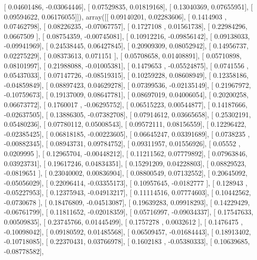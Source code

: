 \documentclass{article}
\begin{document}
       [ 0.04601486, -0.03064446],
       [ 0.07529835,  0.01819168],
       [ 0.13040369,  0.07655951],
       [ 0.09594622,  0.06176055]]), array([[ 0.09140201,  0.02283606],
       [ 0.1414903 ,  0.07462798],
       [ 0.08226235, -0.07067757],
       [ 0.1727108 ,  0.01561738],
       [ 0.22984296,  0.0667509 ],
       [ 0.08754359, -0.00745081],
       [ 0.10912216, -0.09856142],
       [ 0.09138033, -0.09941969],
       [ 0.24538445,  0.06427845],
       [ 0.20909309,  0.08052942],
       [ 0.14956737,  0.02275229],
       [ 0.08373613,  0.071151  ],
       [ 0.05708658,  0.01408891],
       [ 0.05710898,  0.08101997],
       [ 0.21988088, -0.01005381],
       [ 0.1479653 , -0.05524875],
       [ 0.0741556 ,  0.05437033],
       [ 0.07147726, -0.08519315],
       [ 0.10259228,  0.08608949],
       [ 0.12358186, -0.04859849],
       [ 0.08897423,  0.04629278],
       [ 0.07399536, -0.02135149],
       [ 0.21967972, -0.10759673],
       [ 0.19137009,  0.08647781],
       [ 0.08697019,  0.04006054],
       [ 0.20200258,  0.06673772],
       [ 0.1760017 , -0.06295752],
       [ 0.06515223,  0.00544877],
       [ 0.14187666, -0.02637505],
       [ 0.13886305, -0.07382708],
       [ 0.07914612,  0.03665658],
       [ 0.25302191,  0.05480236],
       [ 0.07780112,  0.05008543],
       [ 0.09572111,  0.08156559],
       [ 0.12296422, -0.02385425],
       [ 0.06818185, -0.00223605],
       [ 0.06645247,  0.03391689],
       [ 0.0738235 , -0.00882345],
       [ 0.08943731,  0.09784752],
       [ 0.09311957,  0.01556926],
       [ 0.05552   ,  0.0209995 ],
       [ 0.12965704, -0.00448212],
       [ 0.11211562,  0.07779892],
       [ 0.07963846,  0.03923731],
       [ 0.19617246,  0.04834351],
       [ 0.15291209,  0.04228803],
       [ 0.08829523, -0.0819651 ],
       [ 0.23040002,  0.00836904],
       [ 0.08800549,  0.07132552],
       [ 0.20645092, -0.05056029],
       [ 0.22096414, -0.03355173],
       [ 0.10957645, -0.0182777 ],
       [ 0.128943  , -0.05227953],
       [ 0.12375943, -0.04913217],
       [ 0.11114516,  0.07774603],
       [ 0.10442562, -0.0730678 ],
       [ 0.18476809, -0.04513087],
       [ 0.19639283,  0.09918293],
       [ 0.14229429, -0.06761799],
       [ 0.11811652, -0.02018359],
       [ 0.05716997, -0.09034337],
       [ 0.17547633,  0.00509835],
       [ 0.23745766,  0.01445499],
       [ 0.1757278 ,  0.0032612 ],
       [ 0.1476475 , -0.10098042],
       [ 0.09180592,  0.01485568],
       [ 0.06509457, -0.01684443],
       [ 0.18913402, -0.10718085],
       [ 0.22370431,  0.03766978],
       [ 0.1602183 , -0.05380333],
       [ 0.10639685, -0.08778582],
\end{document}
